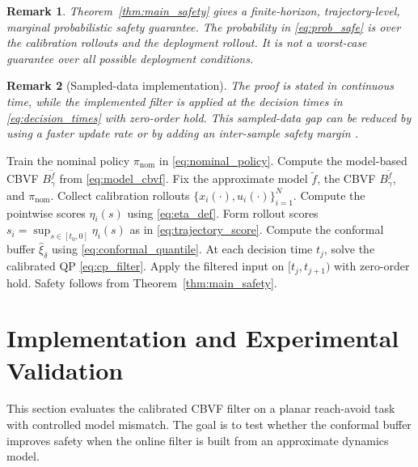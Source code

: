 \documentclass[letterpaper,10pt,conference]{ieeeconf}
\newtheorem{remark}{Remark}
\newcommand{\Bm}{B_{\gamma}^{\tilde f}}
\newcommand{\fapp}{\widetilde{f}}
\newcommand{\xv}{x}
\newcommand{\uv}{u}
\begin{document}
\begin{remark}
Theorem~\ref{thm:main_safety} gives a finite-horizon, trajectory-level, marginal
probabilistic safety guarantee. The probability in \eqref{eq:prob_safe} is over
the calibration rollouts and the deployment rollout. It is not a worst-case
guarantee over all possible deployment conditions.
\end{remark}

\begin{remark}[Sampled-data implementation]
\label{rem:sampled_data}
The proof is stated in continuous time, while the implemented filter is applied
at the decision times in \eqref{eq:decision_times} with zero-order hold. This
sampled-data gap can be reduced by using a faster update rate or by adding an
inter-sample safety margin
\cite{fisac2019general,alshiekh2018safe,lu2025adaptiveshielding}.
\end{remark}

\begin{algorithm}[t]
\caption{Conformal CBVF shielding workflow}
\label{alg:conformal_cbvf_workflow}
\scriptsize
\begin{algorithmic}[1]
\State Train the nominal policy $\pi_{\mathrm{nom}}$ in
\eqref{eq:nominal_policy}.
\State Compute the model-based CBVF $\Bm$ from \eqref{eq:model_cbvf}.
\State Fix the approximate model $\fapp$, the CBVF $\Bm$, and
$\pi_{\mathrm{nom}}$.
\State Collect calibration rollouts $\{\xv_i(\cdot),\uv_i(\cdot)\}_{i=1}^N$.
\State Compute the pointwise scores $\eta_i(s)$ using \eqref{eq:eta_def}.
\State Form rollout scores $s_i=\sup_{s\in[t_0,0]}\eta_i(s)$ as in
\eqref{eq:trajectory_score}.
\State Compute the conformal buffer $\widehat\xi_\delta$ using
\eqref{eq:conformal_quantile}.
\State At each decision time $t_j$, solve the calibrated QP
\eqref{eq:cp_filter}.
\State Apply the filtered input on $[t_j,t_{j+1})$ with zero-order hold.
\State Safety follows from Theorem~\ref{thm:main_safety}.
\end{algorithmic}
\end{algorithm}

\section{Implementation and Experimental Validation}
\label{sec:experiments}

This section evaluates the calibrated CBVF filter on a planar reach-avoid task
with controlled model mismatch. The goal is to test whether the conformal
buffer improves safety when the online filter is built from an approximate
dynamics model.
\end{document}
